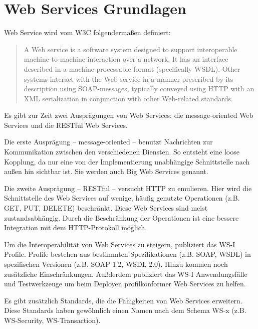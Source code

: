 \documentclass[runningheads]{llncs}
\newcommand{\germanquote}[1]{\glqq{}#1\grqq{}}
\begin{document}
  \label{ws}
  \section{Web Services Grundlagen}
  \nocite{wk_ws}
    \germanquote{Web Service} wird vom W3C folgendermaßen definiert:
    \begin{quote}
      A Web service is a software system designed to support interoperable machine-to-machine interaction over a network. It has an interface described in a machine-processable format (specifically WSDL). Other systems interact with the Web service in a manner prescribed by its description using SOAP-messages, typically conveyed using HTTP with an XML serialization in conjunction with other Web-related standards.\cite{w3c_wsgloss_ws}
    \end{quote}

    Es gibt zur Zeit zwei Ausprägungen von Web Services: die \germanquote{message-oriented Web Services} und die \germanquote{RESTful Web Services}.

    Die erste Ausprägung -- message-oriented -- benutzt Nachrichten zur Kommunikation zwischen den verschiedenen Diensten. So entsteht eine loose Kopplung, da nur eine von der Implementierung unabhängige Schnittstelle nach außen hin sichtbar ist. Sie werden auch \germanquote{Big Web Services} genannt. %

    Die zweite Ausprägung -- RESTful -- versucht HTTP zu emulieren. Hier wird die Schnittstelle des Web Services auf wenige, häufig genutzte Operationen (z.B. GET, PUT, DELETE) beschränkt. Diese Web Services sind meist zustandsabhängig. Durch die Beschränkung der Operationen ist eine bessere Integration mit dem HTTP-Protokoll möglich. %

    Um die Interoperabilität von Web Services zu steigern, publiziert das WS-I\cite{wsi_hp} Profile. Profile bestehen aus bestimmten Spezifikationen (z.B. SOAP, WSDL) in spezifischen Versionen (z.B. SOAP 1.2, WSDL 2.0). Hinzu kommen noch zusätzliche Einschränkungen. Außderdem publiziert das WS-I Anwendungsfälle und Testwerkzeuge um beim Deployen profilkonformer Web Services zu helfen.

    Es gibt zusätzlich Standards, die die Fähigkeiten von Web Services erweitern. Diese Standards haben gewöhnlich einen Namen nach dem Schema \germanquote{WS-x} (z.B. WS-Security, WS-Transaction). %
\end{document}
